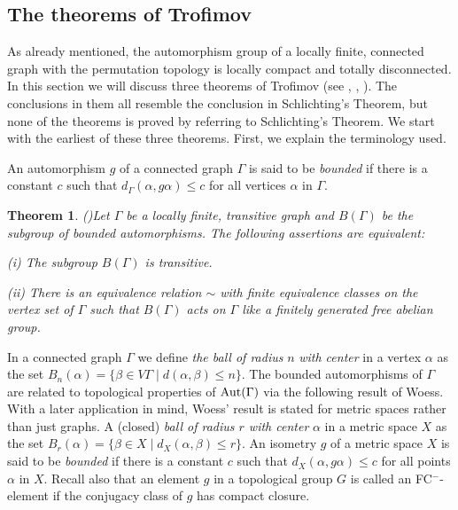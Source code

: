 \documentclass{emsprocart}
\newtheorem{theorem}{Theorem}[section]
\theoremstyle{definition}
\begin{document}
\subsection{The theorems of Trofimov}\label{STrofimov}
As already mentioned, the automorphism group of a locally finite, connected
graph with the permutation topology is locally compact and totally
disconnected.  In this section we will discuss three theorems of
Trofimov (see \cite{Trofimov1984},
\cite{Trofimov1985}, \cite{Trofimov1987}).
The conclusions in them all resemble the conclusion in Schlichting's
Theorem, but none of the theorems is proved by referring to
Schlichting's Theorem.
We start with the earliest of these three theorems.  First, we
explain the terminology used.

An automorphism $g$ of a connected graph
$\Gamma$ 
is said to be {\em bounded} if there is a constant $c$ such that
$d_\Gamma(\alpha,g\alpha)\leq c$ for all vertices $\alpha$ in
$\Gamma$.

\begin{theorem}{\rm (\cite{Trofimov1984})}\label{TTrofimovBounded}
Let $\Gamma$ be a locally finite, transitive graph and $B(\Gamma)$ be the
subgroup of
bounded automorphisms.  The following assertions are equivalent:

(i) The subgroup $B(\Gamma)$ is transitive.

(ii) There is an equivalence relation $\sim$ with finite equivalence
classes on the vertex set of $\Gamma$
such that $B(\Gamma)$ acts on $\Gamma$ like a finitely generated free abelian
group.
\end{theorem}

In a connected graph $\Gamma$  we define {\em the ball of
radius} $n$ {\em with
center} in a vertex $\alpha$ as the set $B_n(\alpha)=\{\beta\in
  V\Gamma\mid d(\alpha, \beta)\leq n\}$.
The bounded
automorphisms of $\Gamma$ are related to topological properties of ${\mbox{${\rm Aut}(\Gamma)$}}$ via the
following result of Woess.   With a later application in mind,
Woess' result is stated for metric spaces rather than
just graphs.  A (closed) {\em ball of radius $r$ with center }
$\alpha$ in a metric space $X$ 
as the set  $B_r(\alpha)=\{\beta\in
  X\mid d_X(\alpha, \beta)\leq r\}$.
An isometry $g$ of a metric space $X$ 
is said to be {\em bounded} if there is a constant $c$ such that
$d_X(\alpha,g\alpha)\leq c$ for all points $\alpha$ in
$X$.
Recall also that an element $g$ in a
topological group $G$ is called an FC\/$^-$-element if the conjugacy
class of $g$ has compact closure.
\end{document}

